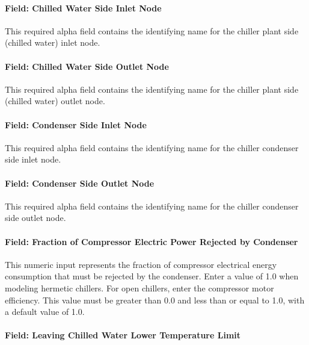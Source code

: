 \paragraph{Field: Chilled Water Side Inlet Node}\label{field-chilled-water-side-inlet-node}

This required alpha field contains the identifying name for the chiller plant side (chilled water) inlet node.

\paragraph{Field: Chilled Water Side Outlet Node}\label{field-chilled-water-side-outlet-node}

This required alpha field contains the identifying name for the chiller plant side (chilled water) outlet node.

\paragraph{Field: Condenser Side Inlet Node}\label{field-condenser-side-inlet-node}

This required alpha field contains the identifying name for the chiller condenser side inlet node.

\paragraph{Field: Condenser Side Outlet Node}\label{field-condenser-side-outlet-node}

This required alpha field contains the identifying name for the chiller condenser side outlet node.

\paragraph{Field: Fraction of Compressor Electric Power Rejected by Condenser}\label{field-fraction-of-compressor-electric-power-rejected-by-condenser-1}

This numeric input represents the fraction of compressor electrical energy consumption that must be rejected by the condenser. Enter a value of 1.0 when modeling hermetic chillers. For open chillers, enter the compressor motor efficiency. This value must be greater than 0.0 and less than or equal to 1.0, with a default value of 1.0.

\paragraph{Field: Leaving Chilled Water Lower Temperature Limit}\label{field-leaving-chilled-water-lower-temperature-limit-1}

